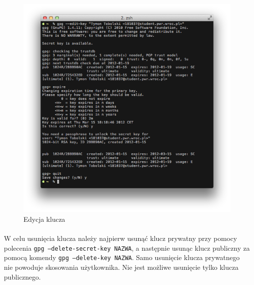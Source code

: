 \documentclass[wide,a4paper,titlepage,12pt] {article}
\begin{document}
  \begin{figure}[h!]
    \begin{center}
      \includegraphics[width=\textwidth]{img/3.png}
      \caption{Edycja klucza}
    \end{center}
  \end{figure}

  \newpage
  \paragraph{}
  \newpage

  \paragraph{}
  W celu usunięcia klucza należy najpierw usunąć klucz prywatny przy pomocy polecenia \texttt{gpg --delete-secret-key NAZWA}, a następnie usunąc klucz publiczny za pomocą komendy \texttt{gpg --delete-key NAZWA}. Samo usunięcie klucza prywatnego nie powoduje skosowania użytkownika. Nie jest możliwe usunięcie tylko klucza publicznego.
\end{document}
